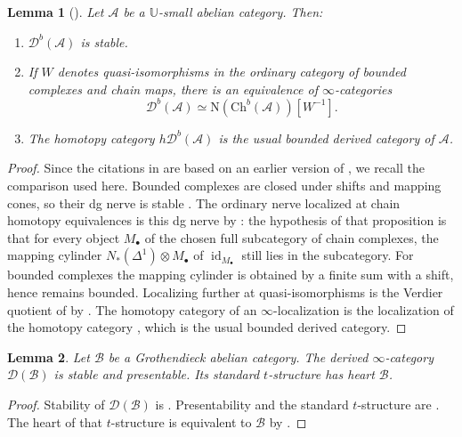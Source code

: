 \documentclass[11pt]{amsart}
\newcommand{\cA}{\mathcal{A}}
\newcommand{\cB}{\mathcal{B}}
\newcommand{\cD}{\mathcal{D}}
\newcommand{\id}{\operatorname{id}}
\newcommand{\Ch}{\mathrm{Ch}}
\newcommand{\Db}{\mathcal D^b}
\theoremstyle{plain}
\newtheorem{lemma}[lemma]{Lemma}
\theoremstyle{definition}
\numberwithin{equation}{section}
\begin{document}
\begin{lemma}[{\cite[Definition 3.1; Theorem 1.3]{Drew}}]\label{lem:bounded-stable}
Let $\cA$ be a $\mathbb U$-small abelian category.
Then:
\begin{enumerate}
\item
$\Db(\cA)$ is stable.
\item
If $W$ denotes quasi-isomorphisms in the ordinary category of bounded complexes and chain maps, there is an equivalence of $\infty$-categories
\begin{equation}\label{eq:relative-model}
 \Db(\cA)\simeq\mathrm N(\Ch^b(\cA))[W^{-1}].
\end{equation}
\item
The homotopy category $h\Db(\cA)$ is the usual bounded derived category of $\cA$.
\end{enumerate}
\end{lemma}
\begin{proof}
Since the citations in \cite{Drew} are based on an earlier version of \cite{HA}, we recall the comparison used here.
Bounded complexes are closed under shifts and mapping cones, so their dg nerve is stable \cite[Proposition 1.3.2.10; Remark 1.3.2.17]{HA}.
The ordinary nerve localized at chain homotopy equivalences is this dg nerve by \cite[Proposition 1.3.4.5]{HA}: the hypothesis of that proposition is that for every object $M_\bullet$ of the chosen full subcategory of chain complexes, the mapping cylinder $N_*(\Delta^1)\otimes M_\bullet$ of $\id_{M_\bullet}$ still lies in the subcategory.
For bounded complexes the mapping cylinder is obtained by a finite sum with a shift, hence remains bounded.
Localizing further at quasi-isomorphisms is the Verdier quotient of  by \cite[Theorem 1.3]{Drew}.
The homotopy category of an $\infty$-localization is the localization of the homotopy category \cite[\href{https://kerodon.net/tag/01MV}{Tag 01MV}]{Kerodon}, which is the usual bounded derived category.
\end{proof}

\begin{lemma}\label{lem:grothendieck-derived}
Let $\cB$ be a Grothendieck abelian category.
The derived $\infty$-category $\cD(\cB)$ is stable and presentable.
Its standard $t$-structure has heart $\cB$.
\end{lemma}
\begin{proof}
Stability of $\cD(\cB)$ is \cite[Proposition 1.3.5.9]{HA}.
Presentability and the standard $t$-structure are \cite[Proposition 1.3.5.21(1)(2)]{HA}.
The heart of that $t$-structure is equivalent to $\cB$ by \cite[Remark 1.3.5.19]{HA}.
\end{proof}
\end{document}
